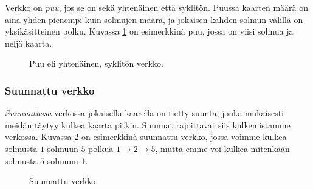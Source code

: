 Verkko on \emph{puu}, jos se on sekä yhtenäinen
että syklitön.
Puussa kaarten määrä on aina yhden pienempi
kuin solmujen määrä, ja jokaisen kahden solmun
välillä on yksikäsitteinen polku.
Kuvassa \ref{fig:verpuu} on esimerkkinä puu,
jossa on viisi solmua ja neljä kaarta.

\begin{figure}
\center
\begin{center}
\end{center}
\caption{Puu eli yhtenäinen, syklitön verkko.}
\label{fig:verpuu}
\end{figure}

\subsubsection{Suunnattu verkko}

\emph{Suunnatussa} verkossa
jokaisella kaarella on tietty suunta,
jonka mukaisesti meidän täytyy kulkea kaarta pitkin.
Suunnat rajoittavat siis kulkemistamme verkossa.
Kuvassa \ref{fig:versuu} on esimerkkinä
suunnattu verkko, jossa
voimme kulkea solmusta $1$ solmuun $5$
polkua $1 \rightarrow 2 \rightarrow 5$,
mutta emme voi kulkea mitenkään solmusta $5$ solmuun $1$.

\begin{figure}
\center
\begin{center}
\end{center}
\caption{Suunnattu verkko.}
\label{fig:versuu}
\end{figure}


